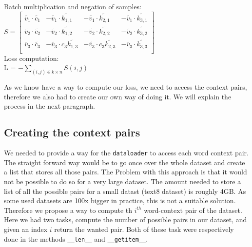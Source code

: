 Batch multiplication and negation of samples:\\
$S = \begin{bmatrix}
\tilde{v_1} \cdot  \tilde{c_1} & -\tilde{v_1} \cdot \tilde{k_{1,1}} & -\tilde{v_1} \cdot  \tilde{k_{2,1}}& -\tilde{v_1} \cdot  \tilde{k_{3,1}}\\
\tilde{v_2} \cdot \tilde{c_2} & -\tilde{v_2} \cdot \tilde{k_{1,2}} & -\tilde{v_2} \cdot \tilde{k_{2,2}} & -\tilde{v_2} \cdot \tilde{k_{3,2}}\\
\tilde{v_3} \cdot \tilde{c_3} &-\tilde{v_3} \cdot c_3  \tilde{k_{1,3}} & -\tilde{v_3} \cdot c_3 \tilde{k_{2,3}}&-\tilde{v_3} \cdot \tilde{k_{3,3}}\\
\end{bmatrix}$\\

Loss computation: \\
 L = $- \sum_{(i,j) \in k \times n} S(i,j) $
 
As we know have a way to compute our loss, we need to access the context pairs, therefore we also had to create our own way of doing it. We will explain the process in the next paragraph.

\subsection{Creating the context pairs}
We needed to provide a way for the \texttt{dataloader} to access each word context pair. The straight forward way would be to go once over the whole dataset and create a list that stores all those pairs. The Problem with this approach is that it would not be possible to do so for a very large dataset. The amount needed to store a list of all the possible pairs for a small datast (text8 dataset) is roughly 4GB.  As some used datasets are 100x bigger in practice, this is not a suitable solution. Therefore we propose a way to compute th $i^{th}$ word-context pair of the dataset. Here we had two tasks, compute the number of possible pairs in our dataset, and given an index $i$ return the wanted pair. Both of these task were respectively done in the methods \texttt{\_\_len\_\_} and \texttt{\_\_getitem\_\_}.

